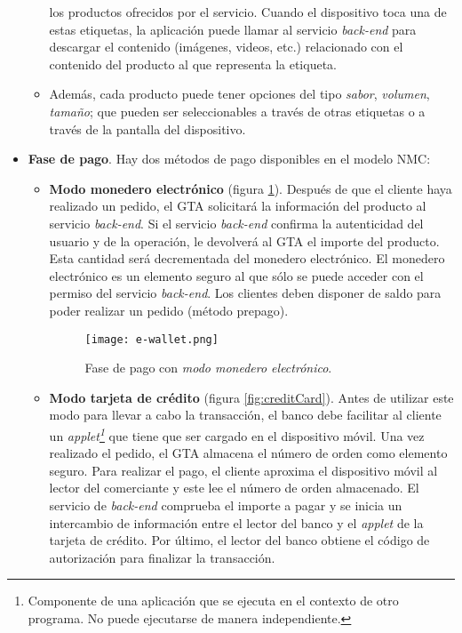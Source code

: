 \begin{itemize}
\begin{itemize}
    los productos ofrecidos por el servicio. Cuando el dispositivo toca una
    de estas etiquetas, la aplicación puede llamar al servicio \emph{back-end}
    para descargar el contenido (imágenes, videos, etc.) relacionado con el
    contenido del producto al que representa la etiqueta.
    \item Además, cada producto puede tener opciones del tipo \emph{sabor},
    \emph{volumen}, \emph{tamaño}; que pueden ser seleccionables a través
    de otras etiquetas o a través de la pantalla del dispositivo.
    \end{itemize}
  \item \textbf{Fase de pago}. Hay dos métodos de pago disponibles en el
  modelo \acs{NMC}:
    \begin{itemize}
    \item \textbf{Modo monedero electrónico} (figura \ref{fig:e-wallet}). 
    Después de que el cliente haya realizado un pedido, el \acs{GTA} 
    solicitará la información del producto al servicio \emph{back-end}. Si el 
    servicio \emph{back-end} confirma la autenticidad del usuario y de la 
    operación, le devolverá al \acs{GTA} el importe del producto. Esta 
    cantidad será decrementada del monedero electrónico. El monedero 
    electrónico es un elemento seguro al que sólo se puede acceder con el 
    permiso del servicio \emph{back-end}. Los clientes deben disponer de saldo 
    para poder realizar un pedido (método prepago).

    \begin{figure}[!h]
      \begin{center}
        \texttt{[image: e-wallet.png]}
        \caption{Fase de pago con \emph{modo monedero electrónico}.}
        \label{fig:e-wallet}
      \end{center}
    \end{figure}

    \item \textbf{Modo tarjeta de crédito} (figura \ref{fig:creditCard}). 
    Antes de utilizar este modo para llevar a cabo la transacción, el banco 
    debe facilitar al cliente un \emph{applet\footnote{Componente de una 
    aplicación que se ejecuta en el contexto de otro programa. No puede 
    ejecutarse de manera independiente.}} que tiene que ser cargado en el 
    dispositivo móvil. Una vez realizado el pedido, el \acs{GTA} almacena el 
    número de orden como elemento seguro. Para realizar el pago, el cliente 
    aproxima el dispositivo móvil al lector del comerciante y este lee el 
    número de orden almacenado. El servicio de \emph{back-end} comprueba el 
    importe a pagar y se inicia un intercambio de información entre el lector 
    del banco y el \emph{applet} de la tarjeta de crédito. Por último, el 
    lector del banco obtiene el código de autorización para finalizar la 
    transacción.
  

\end{itemize}
\end{itemize}
